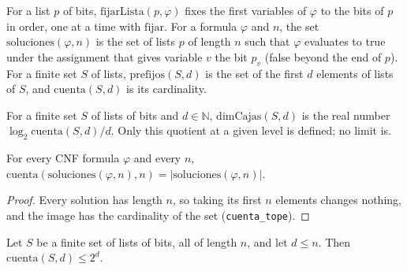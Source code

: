 \begin{definition}
  \label{def:scales-cuenta}
  \leanok
  For a list $p$ of bits, $\mathrm{fijarLista}(p,\varphi)$ fixes the first variables of $\varphi$ to the
  bits of $p$ in order, one at a time with $\mathrm{fijar}$. For a formula $\varphi$ and $n$, the set
  $\mathrm{soluciones}(\varphi,n)$ is the set of lists $p$ of length $n$ such that $\varphi$ evaluates to
  true under the assignment that gives variable $v$ the bit $p_v$ (false beyond the end of $p$). For a
  finite set $S$ of lists, $\mathrm{prefijos}(S,d)$ is the set of the first $d$ elements of lists of $S$,
  and $\mathrm{cuenta}(S,d)$ is its cardinality.
  \own{}
\end{definition}

\begin{definition}
  \label{def:scales-dimcajas}
  \leanok
  For a finite set $S$ of lists of bits and $d \in \mathbb{N}$, $\mathrm{dimCajas}(S,d)$ is the real number
  $\log_2 \mathrm{cuenta}(S,d) / d$. Only this quotient at a given level is defined; no limit is.
  \own{}
\end{definition}

\begin{theorem}
  \label{thm:scales-cuenta-soluciones}
  \leanok
  For every CNF formula $\varphi$ and every $n$, $\mathrm{cuenta}(\mathrm{soluciones}(\varphi,n), n) =
  |\mathrm{soluciones}(\varphi,n)|$.
  \own{}
\end{theorem}

\begin{proof}
  \leanok
  Every solution has length $n$, so taking its first $n$ elements changes nothing, and the image has the
  cardinality of the set (\texttt{cuenta\_tope}).
\end{proof}

\begin{theorem}
  \label{thm:scales-cuenta-le-pow}
  \leanok
  Let $S$ be a finite set of lists of bits, all of length $n$, and let $d \le n$. Then
  $\mathrm{cuenta}(S,d) \le 2^d$.
  \own{}
\end{theorem}

